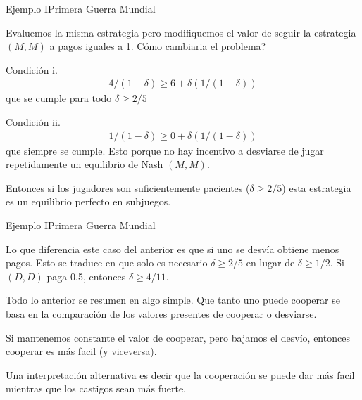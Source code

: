 \documentclass[notes, 11pt]{beamer} %
\newenvironment{wideitemize}{\itemize\addtolength{\itemsep}{10pt}}{\enditemize}
\begin{document}
\begin{frame}{Ejemplo I}{Primera Guerra Mundial}
	\begin{wideitemize}
		\item<1-> Evaluemos la misma estrategia pero modifiquemos el valor de seguir la estrategia $(M,M)$ a pagos iguales a 1. C\'omo cambiaria el problema?

			\begin{wideitemize}
			\item<2->[--] Condici\'on i. 
				\begin{align*}
					4/(1-\delta) \geq 6 + \delta (1/(1-\delta))
				\end{align*} que se cumple para todo $\delta \geq 2/5$
			\item<3->[--] Condici\'on ii.
				\begin{align*}
					1/(1-\delta) \geq 0 + \delta (1/(1-\delta))
				\end{align*} que siempre se cumple. Esto porque no hay incentivo a desviarse de jugar repetidamente un equilibrio de Nash $(M,M)$.
			\item<4-> Entonces si los jugadores son suficientemente pacientes ($\delta \geq 2/5$) esta estrategia es un equilibrio perfecto en subjuegos.
			\end{wideitemize}
	\end{wideitemize}
\end{frame}

\begin{frame}{Ejemplo I}{Primera Guerra Mundial}
	\begin{wideitemize}
		\item<1-> Lo que diferencia este caso del anterior es que si uno se desv\'ia obtiene menos pagos. Esto se traduce en que solo es necesario $\delta \geq 2/5$ en lugar de $\delta \geq 1/2$. Si $(D,D)$ paga 0.5, entonces $\delta \geq 4/11$.
		\item<2-> Todo lo anterior se resumen en algo simple. Que tanto uno puede cooperar se basa en la comparaci\'on de los valores presentes de cooperar o desviarse.
		\item<3-> Si mantenemos constante el valor de cooperar, pero bajamos el desv\'io, entonces cooperar es m\'as facil (y viceversa).
		\item<4-> Una interpretaci\'on alternativa es decir que la cooperaci\'on se puede dar m\'as facil mientras que los castigos sean m\'as fuerte.
	\end{wideitemize}
\end{frame}
\end{document}
